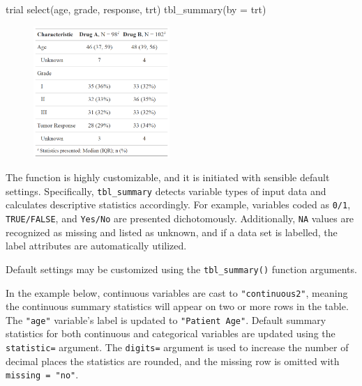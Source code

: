 \begin{example}
trial %
  select(age, grade, response, trt) %
  tbl_summary(by = trt)
\end{example}
\begin{figure}[h!]
  \includegraphics[height=5cm]{summary_basic.png}
  \centering
\end{figure}

The function is highly customizable, and it is initiated with sensible default settings.
Specifically, \texttt{tbl\_summary} detects variable types of input data and calculates descriptive statistics accordingly.
For example, variables coded as \texttt{0/1}, \texttt{TRUE/FALSE}, and \texttt{Yes/No} are presented dichotomously.
Additionally, \texttt{NA} values are recognized as missing and listed as unknown, and if a data set is labelled, the label attributes are automatically utilized. 

Default settings may be customized using the \texttt{tbl\_summary()} function arguments.



In the example below, continuous variables are cast to \texttt{"continuous2"}, meaning the continuous summary statistics will appear on two or more rows in the table.
The \texttt{"age"} variable's label is updated to \texttt{"Patient Age"}.
Default summary statistics for both continuous and categorical variables are updated using the \texttt{statistic=} argument.
The \texttt{digits=} argument is used to increase the number of decimal places the statistics are rounded, and the missing row is omitted with \texttt{missing = "no"}.

